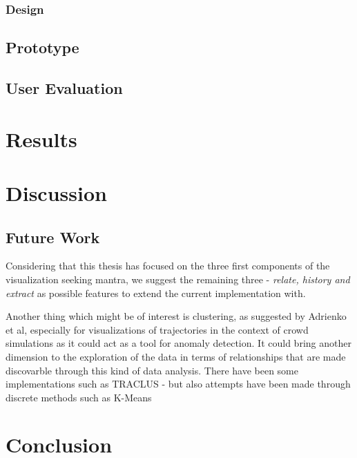 \documentclass{kththesis}
\begin{document}
\subsection{Design}

\section{Prototype}

\section{User Evaluation}







\chapter{Results}

\chapter{Discussion}
\section{Future Work}

Considering that this thesis has focused on the three first components of the visualization seeking mantra, we suggest the remaining three - \emph{relate, history and extract} as possible features to extend the current implementation with.

Another thing which might be of interest is clustering, as suggested by Adrienko et al, especially for visualizations of trajectories in the context of crowd simulations as it could act as a tool for anomaly detection. It could bring another dimension to the exploration of the data in terms of relationships that are made discovarble through this kind of data analysis. There have been some implementations such as TRACLUS - but also attempts have been made through discrete methods such as K-Means



\chapter{Conclusion}


\printbibliography[heading=bibintoc] %

\appendix
\end{document}
